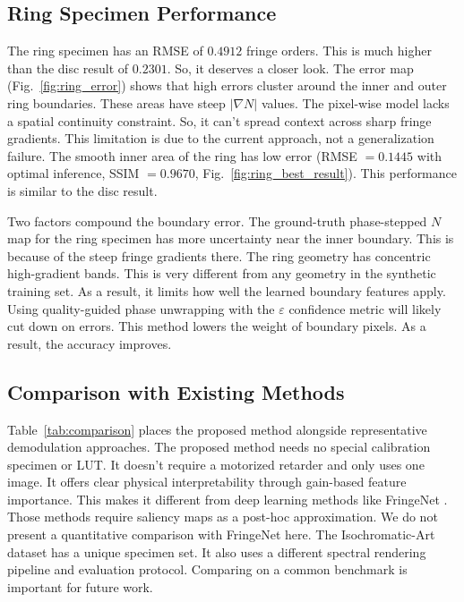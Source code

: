 \documentclass[review,12pt]{elsarticle}
\begin{document}
\subsection{Ring Specimen Performance}
The ring specimen has an RMSE of $0.4912$ fringe orders. This is much higher than the disc result of $0.2301$. So, it deserves a closer look. The error map (Fig.~\ref{fig:ring_error}) shows that high errors cluster around the inner and outer ring boundaries. These areas have steep $|\nabla N|$ values. The pixel-wise model lacks a spatial continuity constraint. So, it can't spread context across sharp fringe gradients. This limitation is due to the current approach, not a generalization failure. The smooth inner area of the ring has low error (RMSE $= 0.1445$ with optimal inference, SSIM $= 0.9670$, Fig.~\ref{fig:ring_best_result}). This performance is similar to the disc result.

Two factors compound the boundary error. The ground-truth phase-stepped $N$ map for the ring specimen has more uncertainty near the inner boundary. This is because of the steep fringe gradients there. The ring geometry has concentric high-gradient bands. This is very different from any geometry in the synthetic training set. As a result, it limits how well the learned boundary features apply. Using quality-guided phase unwrapping \cite{ramji2010,ramesh2004} with the $\varepsilon$ confidence metric will likely cut down on errors. This method lowers the weight of boundary pixels. As a result, the accuracy improves.

\subsection{Comparison with Existing Methods}

Table~\ref{tab:comparison} places the proposed method alongside representative demodulation approaches. The proposed method needs no special calibration specimen or LUT. It doesn't require a motorized retarder and only uses one image. It offers clear physical interpretability through gain-based feature importance. This makes it different from deep learning methods like FringeNet \cite{mohan2024}. Those methods require saliency maps as a post-hoc approximation. We do not present a quantitative comparison with FringeNet here. The Isochromatic-Art dataset \cite{mohan2024} has a unique specimen set. It also uses a different spectral rendering pipeline and evaluation protocol. Comparing on a common benchmark is important for future work.
\end{document}
